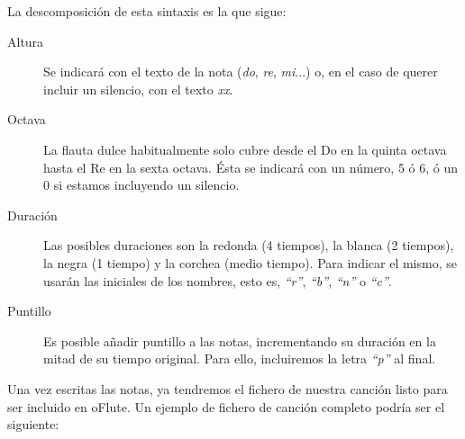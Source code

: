 La descomposición de esta sintaxis es la que sigue:
\begin{description}
\item[Altura] Se indicará con el texto de la nota (\textit{do}, \textit{re},
  \textit{mi}...) o, en el caso de querer incluir un silencio, con el texto
  \textit{xx}.
\item[Octava] La flauta dulce habitualmente solo cubre desde el Do en la quinta
  octava hasta el Re en la sexta octava. Ésta se indicará con un número, 5 ó 6,
  ó un 0 si estamos incluyendo un silencio.
\item[Duración] Las posibles duraciones son la redonda (4 tiempos), la blanca (2
  tiempos), la negra (1 tiempo) y la corchea (medio tiempo). Para indicar el
  mismo, se usarán las iniciales de los nombres, esto es, \textit{``r''},
  \textit{``b''}, \textit{``n''} o \textit{``c''}.
\item[Puntillo] Es posible añadir puntillo a las notas, incrementando su
  duración en la mitad de su tiempo original. Para ello, incluiremos la letra
  \textit{``p''} al final.
\end{description}

Una vez escritas las notas, ya tendremos el fichero de nuestra canción listo
para ser incluido en oFlute. Un ejemplo de fichero de canción completo podría
ser el siguiente:

\inputminted{xml}{apendice_manual_canciones/snippet_5}


